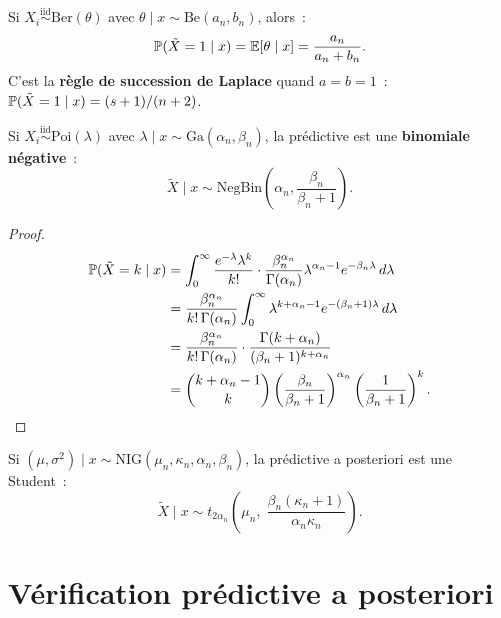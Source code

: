 \begin{theoreme}
Si $X_i \overset{\text{iid}}{\sim} \text{Ber}(\theta)$ avec
$\theta \mid x \sim \text{Be}(a_n, b_n)$, alors~:
\[
  \mathbb{P}(\tilde{X} = 1 \mid x) = \mathbb{E}[\theta \mid x] = \frac{a_n}{a_n + b_n}.
\]
C'est la \textbf{r\`egle de succession de Laplace} quand $a = b = 1$~:
$\mathbb{P}(\tilde{X} = 1 \mid x) = (s+1)/(n+2)$.
\end{theoreme}

\begin{theoreme}
Si $X_i \overset{\text{iid}}{\sim} \text{Poi}(\lambda)$ avec
$\lambda \mid x \sim \text{Ga}(\alpha_n, \beta_n)$, la pr\'edictive est
une \textbf{binomiale n\'egative}~:
\[
  \tilde{X} \mid x \sim \text{NegBin}\!\left(\alpha_n, \frac{\beta_n}{\beta_n + 1}\right).
\]
\end{theoreme}

\begin{proof}
\begin{align*}
  \mathbb{P}(\tilde{X} = k \mid x)
  &= \int_0^\infty \frac{e^{-\lambda}\lambda^k}{k!}
  \cdot \frac{\beta_n^{\alpha_n}}{\Gamma(\alpha_n)}
  \lambda^{\alpha_n - 1} e^{-\beta_n \lambda}\,d\lambda \\
  &= \frac{\beta_n^{\alpha_n}}{k!\,\Gamma(\alpha_n)}
  \int_0^\infty \lambda^{k + \alpha_n - 1} e^{-(\beta_n + 1)\lambda}\,d\lambda \\
  &= \frac{\beta_n^{\alpha_n}}{k!\,\Gamma(\alpha_n)}
  \cdot \frac{\Gamma(k + \alpha_n)}{(\beta_n + 1)^{k + \alpha_n}} \\
  &= \binom{k + \alpha_n - 1}{k}
  \left(\frac{\beta_n}{\beta_n + 1}\right)^{\alpha_n}
  \left(\frac{1}{\beta_n + 1}\right)^k.
\end{align*}
\end{proof}

\begin{theoreme}
Si $(\mu, \sigma^2) \mid x \sim \text{NIG}(\mu_n, \kappa_n, \alpha_n, \beta_n)$,
la pr\'edictive a posteriori est une Student~:
\[
  \tilde{X} \mid x \sim t_{2\alpha_n}\!\left(\mu_n,\;
  \frac{\beta_n(\kappa_n + 1)}{\alpha_n \kappa_n}\right).
\]
\end{theoreme}

\section{V\'erification pr\'edictive a posteriori}

